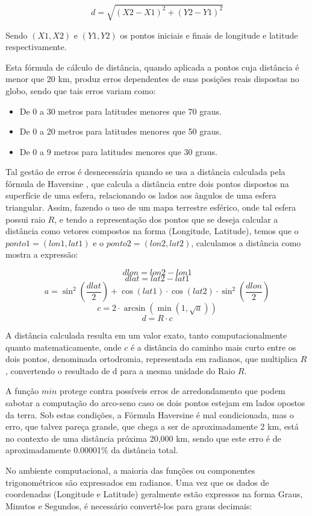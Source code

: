 \[d = \sqrt{(X2 - X1)^2 + (Y2 - Y1)^2}\]

Sendo \((X1, X2)\) e \((Y1,Y2)\) os pontos iniciais e finais de longitude e latitude respectivamente.

Esta fórmula de cálculo de distância, quando aplicada a pontos cuja distância é menor que 20 km, produz erros dependentes de suas posições reais dispostas no globo, sendo que tais erros variam como:
\begin{itemize}
\item De 0 a 30 metros para latitudes menores que 70 graus.
\item De 0 a 20 metros para latitudes menores que 50 graus. 
\item De 0 a 9 metros para latitudes menores que 30 graus.
\end{itemize}

Tal gestão de erros é desnecessária quando se usa a distância calculada pela fórmula de Haversine \cite{shumaker1984astronomical}, que calcula a distância entre dois pontos dispostos na superfície de uma esfera, relacionando os lados aos ângulos de uma esfera triangular. Assim, fazendo o uso de um mapa terrestre esférico, onde tal esfera possui raio \(R\), e tendo a representação dos pontos que se deseja calcular a distância como vetores compostos na forma (Longitude, Latitude), temos que o \(ponto1 = (lon1,lat1)\) e o \(ponto2 = (lon2,lat2)\), calculamos a distância como mostra a expressão:

\[dlon = lon2 - lon1\]
\[dlat = lat2 - lat1\]
\[a = \sin^2\left(\frac{dlat}{2}\right) + \cos(lat1) \cdot \cos(lat2) \cdot \sin^2\left(\frac{dlon}{2}\right)\]
\[c = 2 \cdot \arcsin(\min(1,\sqrt{a}))\]
\[d = R \cdot c\]

A distância calculada resulta em um valor exato, tanto computacionalmente quanto matematicamente, onde \(c\) é a distância do caminho mais curto entre os dois pontos, denominada ortodromia, representada em radianos, que multiplica \(R\), convertendo o resultado de d para a mesma unidade do Raio \(R\). 

A função \(min\) protege contra possíveis erros de arredondamento que podem sabotar a computação do arco-seno caso os dois pontos estejam em lados opostos da terra. Sob estas condições, a Fórmula Haversine é mal condicionada, mas o erro, que talvez pareça grande, que chega a ser de aproximadamente 2 km, está no contexto de uma distância próxima 20,000 km, sendo que este erro é de aproximadamente 0.00001\% da distância total.

No ambiente computacional, a maioria das funções ou componentes trigonométricos são expressados em radianos. Uma vez que os dados de coordenadas (Longitude e Latitude) geralmente estão expressos na forma Graus, Minutos e Segundos, é necessário convertê-los para graus decimais:

